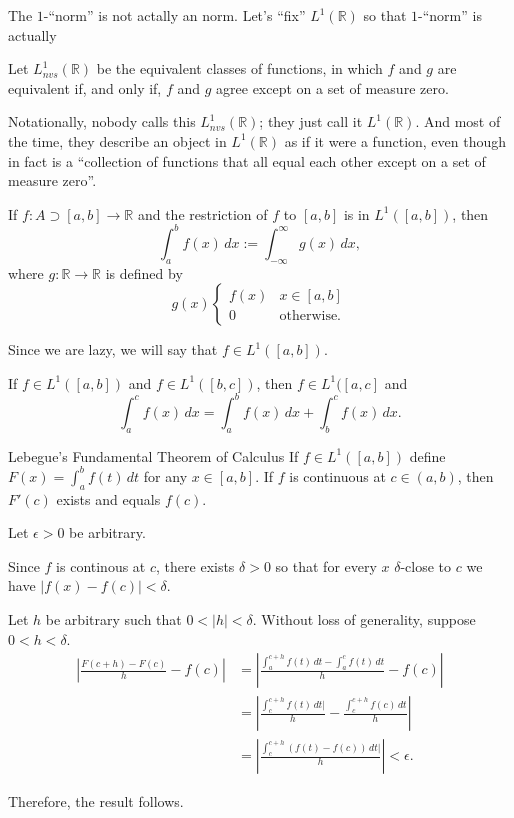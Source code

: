 
The \(1\)-``norm'' is not actally an norm. Let's ``fix'' \(L^1(\mathbb{R})\) so that \(1\)-``norm'' is actually

\begin{defn}{}{}
  Let \(L^1_{nvs}(\mathbb{R})\) be the equivalent classes of functions, in which \(f\) and \(g\) are equivalent if, and only if, \(f\) and \(g\) agree except on a set of measure zero.
\end{defn}

Notationally, nobody calls this \(L^1_{nvs}(\mathbb{R})\); they just call it \(L^1(\mathbb{R})\).
And most of the time, they describe an object in \(L^1(\mathbb{R})\) as if it were a function, even though in fact is a “collection of functions that all equal each other except on a set of measure zero”.

\begin{defn}{}{}
  If \(f \colon A \supset [a, b] \to \mathbb{R}\) and the restriction of \(f\) to \([a, b]\) is in \(L^1([a, b])\), then
  \[
    \int_a^b f(x)\,dx := \int_{-\infty}^\infty g(x)\,dx,
  \] 
  where \(g \colon \mathbb{R} \to \mathbb{R}\) is defined by \[
    g(x)
    \begin{cases}
      f(x) & x \in [a, b] \\
      0 & \text{otherwise.}
    \end{cases}
  \] 
\end{defn}

Since we are lazy, we will say that \(f \in L^1([a, b])\).

\begin{prop}{}{}
  If \(f \in L^1([a, b])\) and \(f \in L^1([b, c])\), then \(f \in L^1([a, c]\) and \[
    \int_a^c f(x)\,dx = \int_a^b f(x)\,dx + \int_b^c f(x)\,dx.
  \] 
\end{prop}

\begin{thm}{Lebegue's Fundamental Theorem of Calculus}{}
  If \(f \in L^1([a, b])\) define \(F(x) = \int_a^b f(t)\,dt\) for any \(x \in [a, b]\).
  If \(f\) is continuous at \(c \in (a, b)\), then \(F'(c)\) exists and equals \(f(c)\).
\end{thm}

\begin{dem}{}{}
  Let \(\epsilon > 0\) be arbitrary.

  Since \(f\) is continous at \(c\), there exists \(\delta > 0\) so that for every \(x\) \(\delta\)-close to \(c\) we have \(|f(x) - f(c)| < \delta\).

  Let \(h\) be arbitrary such that \(0 < |h| < \delta\).  Without loss of generality, suppose \(0 < h < \delta\).
  \begin{align*}
    \left| \frac{F(c+h) - F(c)}{h} - f(c) \right|
      &= \left| \frac{\int_a^{c+h}f(t)\,dt  - \int_a^cf(t)\,dt}{h} - f(c) \right| \\
      &= \left| \frac{\int_c^{c+h}f(t)\,dt|}{h} - \frac{\int_c^{c+h}f(c)\,dt}{h} \right| \\
      &= \left| \frac{\int_c^{c+h} (f(t) - f(c))\,dt|}{h} \right| < \epsilon.
  \end{align*}

  Therefore, the result follows.
\end{dem}
